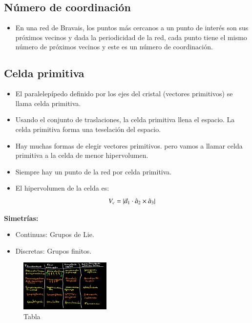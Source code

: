 \subsection{Número de coordinación}

\begin{itemize}
    \item En una red de Bravais, los puntos más cercanos a un punto de interés son sus próximos vecinos y dada la periodicidad de la red, cada punto tiene el mismo número de próximos vecinos y este es un número de coordinación.
\end{itemize}

\subsection{Celda primitiva}

\begin{itemize}
    \item El paralelepípedo definido por los ejes del cristal (vectores primitivos) se llama celda primitiva.
    \item Usando el conjunto de traslaciones, la celda primitiva llena el espacio. La celda primitiva forma una teselación del espacio.
    \item Hay muchas formas de elegir vectores primitivos. pero vamos a llamar celda primitiva a la celda de menor hipervolumen.
    \item Siempre hay un punto de la red por celda primitiva.
    \item El hipervolumen de la celda es:
    $$V_c=\abs*{\vec{a}_1\cdot\hat{a}_2\times\hat{a}_3}$$
\end{itemize}

\textbf{Simetrías:}

\begin{itemize}
    \item[\texttimes] Continuas: Grupos de Lie.
    \item[\checkmark] Discretas: Grupos finitos.
\end{itemize}

\begin{figure}[H]
    \centering
    \includegraphics[width=0.4\textwidth]{Graficas/Aug20.png}
    \caption{Tabla }
    \label{fig:TablaAug20}
\end{figure}

